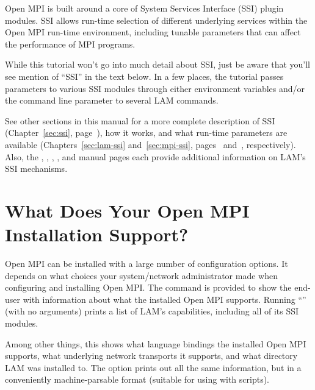 Open MPI is built around a core of System Services Interface (SSI)
plugin modules.  SSI allows run-time selection of different underlying
services within the Open MPI run-time environment, including tunable
parameters that can affect the performance of MPI programs.

While this tutorial won't go into much detail about SSI, just be aware
that you'll see mention of ``SSI'' in the text below.  In a few
places, the tutorial passes parameters to various SSI modules through
either environment variables and/or the  command line
parameter to several LAM commands.

See other sections in this manual for a more complete description of
SSI (Chapter~\ref{sec:ssi}, page~\pageref{sec:ssi}), how it works, and
what run-time parameters are available (Chapters~\ref{sec:lam-ssi}
and~\ref{sec:mpi-ssi}, pages~\pageref{sec:lam-ssi}
and~\pageref{sec:mpi-ssi}, respectively).  Also, the
, ,
, , and
 manual pages each provide additional
information on LAM's SSI mechanisms.
 

\section{What Does Your Open MPI Installation Support?}

Open MPI can be installed with a large number of configuration options.
It depends on what choices your system/network administrator made when
configuring and installing Open MPI.  The  command is
provided to show the end-user with information about what the
installed Open MPI supports.  Running ``'' (with no
arguments) prints a list of LAM's capabilities, including all of its
SSI modules.

Among other things, this shows what language bindings the installed
Open MPI supports, what underlying network transports it supports, and
what directory LAM was installed to.  The  option
prints out all the same information, but in a conveniently
machine-parsable format (suitable for using with scripts).


